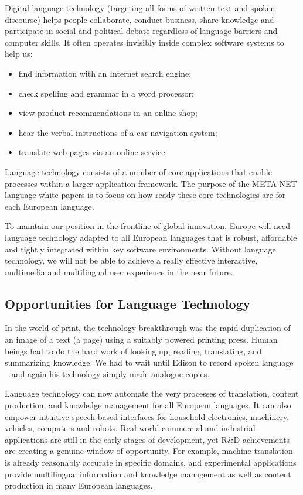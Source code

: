\begin{multicols}{2}
    Digital language technology (targeting all forms of written text and spoken discourse) helps people collaborate, conduct business, share knowledge and participate in social and political debate regardless of language barriers and computer skills. It often operates invisibly inside complex software systems to help us:
    \begin{itemize}
      \item find information with an Internet search engine;
      \item check spelling and grammar in a word processor;
      \item view product recommendations in an online shop;
      \item hear the verbal instructions of a car navigation system;
      \item translate web pages via an online service.
    \end{itemize}
    Language technology consists of a number of core applications that enable processes within a larger application framework. The purpose of the META-NET language white papers is to focus on how ready these core technologies are for each European language. 


    To maintain our position in the frontline of global innovation, Europe will need language technology adapted to all European languages that is robust, affordable and tightly integrated within key software environments. Without language technology, we will not be able to achieve a really effective interactive, multimedia and multilingual user experience in the near future.

\subsection{Opportunities for Language Technology}


    In the world of print, the technology breakthrough was the rapid duplication of an image of a text (a page) using a suitably powered printing press. Human beings had to do the hard work of looking up, reading, translating, and summarizing knowledge. We had to wait until Edison to record spoken language – and again his technology simply made analogue copies.

    Language technology can now automate the very processes of translation, content production, and knowledge management for all European languages. It can also empower intuitive speech-based interfaces for household electronics, machinery, vehicles, computers and robots. Real-world commercial and industrial applications are still in the early stages of development, yet R\&D achievements are creating a genuine window of opportunity. For example, machine translation is already reasonably accurate in specific domains, and experimental applications provide multilingual information and knowledge management as well as content production in many European languages. 


\end{multicols}
